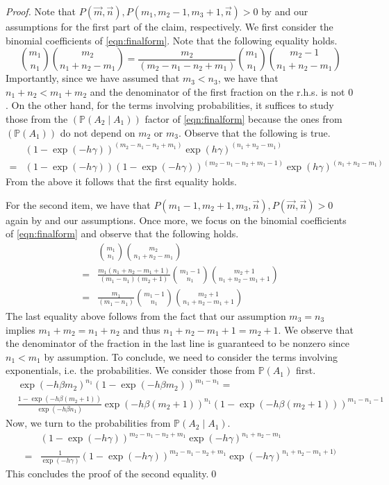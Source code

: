 \begin{proof}
  Note that $P(\vec{m},\vec{n}), P(m_1,m_2-1,m_3+1,\vec{n})> 0$ by
   and our assumptions for the first part of the claim, respectively.
  We first consider the binomial coefficients of \eqref{eqn:finalform}. Note
  that the following equality holds. 
  \[
    \binom{m_1}{n_1} \binom{m_2}{n_1+n_2-m_1} =
    \frac{m_2}{(m_2-n_1-n_2+m_1)} \binom{m_1}{n_1}
    \binom{m_2-1}{n_1+n_2-m_1}
  \]
  Importantly, since we have assumed that $m_3 < n_3$, we have that $n_1 + n_2 < m_1 + m_2$ and the denominator of the first fraction on the r.h.s. is not $0$.
  On the other hand, for the terms involving probabilities, it suffices to
  study those from the $(\mathbb{P}(A_2 \mid A_1))$ factor of
  \eqref{eqn:finalform} because the ones from $(\mathbb{P}(A_1))$ do not depend on $m_2$ or $m_3$. Observe that the following is true.
  \begin{align*}
    & (1 - \exp(-h\gamma))^{(m_2-n_1-n_2+m_1)}
    \exp(h\gamma)^{(n_1+n_2-m_1)}\\
    {}={} &(1-\exp(-h\gamma)) (1 - \exp(-h\gamma))^{(m_2-n_1-n_2+m_1-1)} \exp(h\gamma)^{(n_1+n_2-m_1)}
  \end{align*}
  From the above it follows that the first equality holds.
  
  For the second item, we have that $P(m_1-1,m_2+1,m_3,\vec{n}),P(\vec{m},\vec{n}) > 0$ again by  and our assumptions. Once more, we focus on the binomial coefficients of \eqref{eqn:finalform} and observe that the following holds.
  \begin{align*}
    &\binom{m_1}{n_1} \binom{m_2}{n_1+n_2-m_1}\\
    {}={} & 
    \frac{m_1(n_1+n_2-m_1+1)}{(m_1-n_1) (m_2+1)}
    \binom{m_1-1}{n_1} \binom{m_2+1}{n_1+n_2-m_1+1}\\
    {}={} &
    \frac{m_1}{(m_1-n_1)}
    \binom{m_1-1}{n_1} \binom{m_2+1}{n_1+n_2-m_1+1}
  \end{align*}
  The last equality above follows from the fact that our assumption $m_3=n_3$ implies $m_1+m_2 = n_1+n_2$ and thus $n_1+n_2-m_1+1=m_2+1$. We observe that the denominator of the fraction in the last line is guaranteed to be nonzero since $n_1 < m_1$ by assumption. To conclude, we need to consider the terms involving exponentials, i.e. the probabilities. We consider those from $\mathbb{P}(A_1)$ first.
  \begin{align*}
    & \exp(-h\beta m_2)^{n_1} (1- \exp(-h\beta m_2))^{m_1-n_1} = {}\\
    & \frac{1-\exp(-h\beta (m_2+1))}{\exp(-h\beta n_1)} \exp(-h\beta (m_2+1))^{n_1} (1- \exp(-h\beta (m_2+1)))^{m_1-n_1-1}
  \end{align*}
  Now, we turn to the probabilities from $\mathbb{P}(A_2 \mid A_1)$.
  \begin{align*}
    & (1-\exp(-h\gamma))^{m_2-n_1-n_2+m_1}\exp(-h\gamma)^{n_1+n_2-m_1}\\
    {}={} & \frac{1}{\exp(-h\gamma)} (1 - \exp(-h\gamma))^{m_2-n_1-n_2+m_1} \exp(-h\gamma)^{n_1+n_2-m_1+1)}
  \end{align*}
  This concludes the proof of the second equality.\qed
\end{proof}

